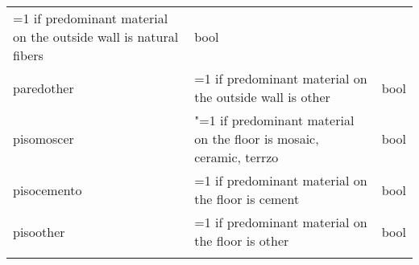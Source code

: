 \documentclass[11pt]{article}
\begin{document}
\begin{longtable}[]{@{}lll@{}}
\begin{minipage}[t]{0.16\columnwidth}
=1 if predominant material on the outside wall is natural fibers\strut
\end{minipage} & \begin{minipage}[t]{0.24\columnwidth}\raggedright\strut
bool\strut
\end{minipage}\tabularnewline
\begin{minipage}[t]{0.19\columnwidth}\raggedright\strut
paredother\strut
\end{minipage} & \begin{minipage}[t]{0.16\columnwidth}\raggedright\strut
=1 if predominant material on the outside wall is other\strut
\end{minipage} & \begin{minipage}[t]{0.24\columnwidth}\raggedright\strut
bool\strut
\end{minipage}\tabularnewline
\begin{minipage}[t]{0.19\columnwidth}\raggedright\strut
pisomoscer\strut
\end{minipage} & \begin{minipage}[t]{0.16\columnwidth}\raggedright\strut
"=1 if predominant material on the floor is mosaic, ceramic,
terrzo\strut
\end{minipage} & \begin{minipage}[t]{0.24\columnwidth}\raggedright\strut
bool\strut
\end{minipage}\tabularnewline
\begin{minipage}[t]{0.19\columnwidth}\raggedright\strut
pisocemento\strut
\end{minipage} & \begin{minipage}[t]{0.16\columnwidth}\raggedright\strut
=1 if predominant material on the floor is cement\strut
\end{minipage} & \begin{minipage}[t]{0.24\columnwidth}\raggedright\strut
bool\strut
\end{minipage}\tabularnewline
\begin{minipage}[t]{0.19\columnwidth}\raggedright\strut
pisoother\strut
\end{minipage} & \begin{minipage}[t]{0.16\columnwidth}\raggedright\strut
=1 if predominant material on the floor is other\strut
\end{minipage} & \begin{minipage}[t]{0.24\columnwidth}\raggedright\strut
bool\strut
\end{minipage}\tabularnewline
\begin{minipage}[t]{0.19\columnwidth}\raggedright\strut

\end{minipage}
\end{longtable}
\end{document}

